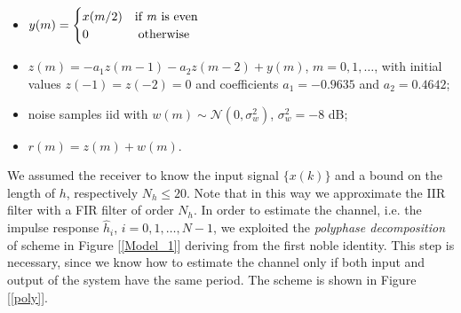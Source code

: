 \documentclass[a4paper, 12pt]{report}
\begin{document}
\begin{itemize}
	\item $y(m) = \begin{cases}
					x(m/2)  \quad \text{if \textit{m} is even} \\
					0 \quad\quad\quad\quad \text{otherwise} 
	\end{cases} $ \\
	\item $z(m) = -a_1z(m-1)-a_2z(m-2)+y(m)$, $m=0,1,\dots$, with initial values $z(-1)=z(-2)=0$ and coefficients $a_1 = -0.9635$ and $a_2 = 0.4642$;
	\item noise samples iid with $w(m)\sim\mathcal{N}(0,\sigma_w^2)$, $\sigma_w^2=-8$ dB;
	\item $r(m) = z(m)+w(m)$.
\end{itemize}
We assumed the receiver to know the input signal $\{ x(k)\}$ and a bound on the length of $h$, respectively $N_h \le 20$. Note that in this way we approximate the IIR filter with a FIR filter of order $N_h$. In order to estimate the channel, i.e. the impulse response $\hat{h}_i$, $i=0,1,\dots,N-1$, we exploited the \textit{polyphase decomposition} of scheme in Figure [\ref{Model_1}] deriving from the first noble identity. This step is necessary, since we know how to estimate the channel only if both input and output of the system have the same period. The scheme is shown in Figure [\ref{poly}].
\end{document}
